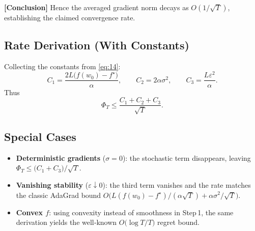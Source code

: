 \documentclass{article}
\begin{document}
\noindent\textbf{[Conclusion]} Hence the averaged gradient norm decays as
$O(1/\sqrt{T})$, establishing the claimed convergence rate.

\subsection*{Rate Derivation (With Constants)}
Collecting the constants from \eqref{eq:14}:
\[
C_{1}= \frac{2L\bigl(f(w_{0})-f^{\star}\bigr)}{\alpha},\qquad
C_{2}= 2\alpha\sigma^{2},\qquad
C_{3}= \frac{L\varepsilon^{2}}{\alpha}.
\]
Thus
\[
\Phi_{T}\le\frac{C_{1}+C_{2}+C_{3}}{\sqrt{T}} .
\]

\subsection*{Special Cases}
\begin{itemize}
\item \textbf{Deterministic gradients} ($\sigma=0$): the stochastic term disappears,
  leaving $\Phi_{T}\le\bigl(C_{1}+C_{3}\bigr)/\sqrt{T}$.
\item \textbf{Vanishing stability} ($\varepsilon\downarrow0$): the third term
  vanishes and the rate matches the classic AdaGrad bound
  $O\bigl(L(f(w_{0})-f^{\star})/(\alpha\sqrt{T})+ \alpha\sigma^{2}/\sqrt{T}\bigr)$.
\item \textbf{Convex $f$}: using convexity instead of smoothness in Step 1,
  the same derivation yields the well‑known $O\bigl(\log T/T\bigr)$ regret bound.
\end{itemize}
\end{document}

